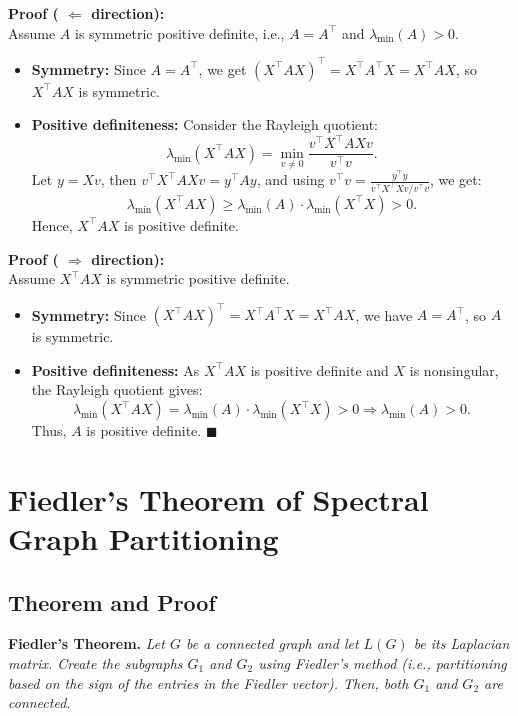 \documentclass[hidelinks,12pt]{article}
\begin{document}
\vspace{0.5em}
\noindent \textbf{Proof ( \( \Leftarrow\) direction):} \\
Assume \( A \) is symmetric positive definite, i.e., \( A = A^\top \) and \( \lambda_{\min}(A) > 0 \).
\begin{itemize}
    \item \textbf{Symmetry:} Since \( A = A^\top \), we get \( (X^\top A X)^\top = X^\top A^\top X = X^\top A X \), so \( X^\top A X \) is symmetric.
    \item \textbf{Positive definiteness:} Consider the Rayleigh quotient:
    \[
    \lambda_{\min}(X^\top A X) = \min_{v \ne 0} \frac{v^\top X^\top A X v}{v^\top v}.
    \]
    Let \( y = Xv \), then \( v^\top X^\top A X v = y^\top A y \), and using \( v^\top v = \frac{y^\top y}{v^\top X^\top X v / v^\top v} \), we get:
    \[
    \lambda_{\min}(X^\top A X) \ge \lambda_{\min}(A) \cdot \lambda_{\min}(X^\top X) > 0.
    \]
    Hence, \( X^\top A X \) is positive definite.
\end{itemize}

\newpage
\vspace{0.5em}
\noindent \textbf{Proof ( \( \Rightarrow\) direction):} \\
Assume \( X^\top A X \) is symmetric positive definite.
\begin{itemize}
    \item \textbf{Symmetry:} Since \( (X^\top A X)^\top = X^\top A^\top X = X^\top A X \), we have \( A = A^\top \), so \( A \) is symmetric.
    \item \textbf{Positive definiteness:} As \( X^\top A X \) is positive definite and \( X \) is nonsingular, the Rayleigh quotient gives:
    \[
    \lambda_{\min}(X^\top A X) = \lambda_{\min}(A) \cdot \lambda_{\min}(X^\top X) > 0 \Rightarrow \lambda_{\min}(A) > 0.
    \]
    Thus, \( A \) is positive definite. \hfill \(\blacksquare\)
\end{itemize}
\newpage
\section{Fiedler’s Theorem of Spectral Graph Partitioning}


\subsection*{Theorem and Proof}

\textbf{Fiedler’s Theorem.} \textit{Let $G$ be a connected graph and let $L(G)$ be its Laplacian matrix. Create the subgraphs $G_1$ and $G_2$ using Fiedler’s method (i.e., partitioning based on the sign of the entries in the Fiedler vector). Then, both $G_1$ and $G_2$ are connected.}
\end{document}
